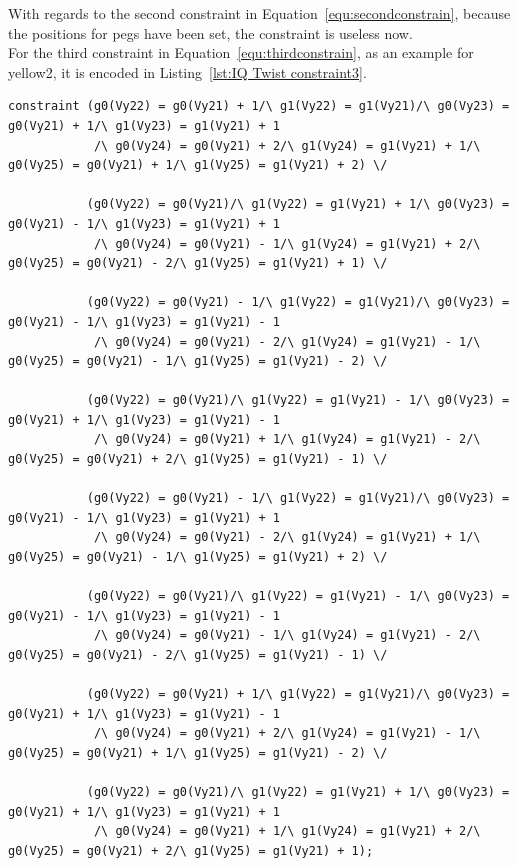 \bigskip
\smallbreak
With regards to the second constraint in Equation~\ref{equ:secondconstrain}, because the positions for pegs have been set, the constraint is useless now.
\\For the third constraint in Equation~\ref{equ:thirdconstrain}, as an example for yellow2, it is encoded in Listing~\ref{lst:IQ Twist constraint3}.
\begin{lstlisting}[language=minizinc,numbers=none,caption={Encoding for constraint three},label={lst:IQ Twist constraint3}]
constraint (g0(Vy22) = g0(Vy21) + 1/\ g1(Vy22) = g1(Vy21)/\ g0(Vy23) = g0(Vy21) + 1/\ g1(Vy23) = g1(Vy21) + 1
            /\ g0(Vy24) = g0(Vy21) + 2/\ g1(Vy24) = g1(Vy21) + 1/\ g0(Vy25) = g0(Vy21) + 1/\ g1(Vy25) = g1(Vy21) + 2) \/
            
           (g0(Vy22) = g0(Vy21)/\ g1(Vy22) = g1(Vy21) + 1/\ g0(Vy23) = g0(Vy21) - 1/\ g1(Vy23) = g1(Vy21) + 1
            /\ g0(Vy24) = g0(Vy21) - 1/\ g1(Vy24) = g1(Vy21) + 2/\ g0(Vy25) = g0(Vy21) - 2/\ g1(Vy25) = g1(Vy21) + 1) \/
            
           (g0(Vy22) = g0(Vy21) - 1/\ g1(Vy22) = g1(Vy21)/\ g0(Vy23) = g0(Vy21) - 1/\ g1(Vy23) = g1(Vy21) - 1
            /\ g0(Vy24) = g0(Vy21) - 2/\ g1(Vy24) = g1(Vy21) - 1/\ g0(Vy25) = g0(Vy21) - 1/\ g1(Vy25) = g1(Vy21) - 2) \/
            
           (g0(Vy22) = g0(Vy21)/\ g1(Vy22) = g1(Vy21) - 1/\ g0(Vy23) = g0(Vy21) + 1/\ g1(Vy23) = g1(Vy21) - 1
            /\ g0(Vy24) = g0(Vy21) + 1/\ g1(Vy24) = g1(Vy21) - 2/\ g0(Vy25) = g0(Vy21) + 2/\ g1(Vy25) = g1(Vy21) - 1) \/
            
           (g0(Vy22) = g0(Vy21) - 1/\ g1(Vy22) = g1(Vy21)/\ g0(Vy23) = g0(Vy21) - 1/\ g1(Vy23) = g1(Vy21) + 1
            /\ g0(Vy24) = g0(Vy21) - 2/\ g1(Vy24) = g1(Vy21) + 1/\ g0(Vy25) = g0(Vy21) - 1/\ g1(Vy25) = g1(Vy21) + 2) \/
            
           (g0(Vy22) = g0(Vy21)/\ g1(Vy22) = g1(Vy21) - 1/\ g0(Vy23) = g0(Vy21) - 1/\ g1(Vy23) = g1(Vy21) - 1
            /\ g0(Vy24) = g0(Vy21) - 1/\ g1(Vy24) = g1(Vy21) - 2/\ g0(Vy25) = g0(Vy21) - 2/\ g1(Vy25) = g1(Vy21) - 1) \/
            
           (g0(Vy22) = g0(Vy21) + 1/\ g1(Vy22) = g1(Vy21)/\ g0(Vy23) = g0(Vy21) + 1/\ g1(Vy23) = g1(Vy21) - 1
            /\ g0(Vy24) = g0(Vy21) + 2/\ g1(Vy24) = g1(Vy21) - 1/\ g0(Vy25) = g0(Vy21) + 1/\ g1(Vy25) = g1(Vy21) - 2) \/
            
           (g0(Vy22) = g0(Vy21)/\ g1(Vy22) = g1(Vy21) + 1/\ g0(Vy23) = g0(Vy21) + 1/\ g1(Vy23) = g1(Vy21) + 1
            /\ g0(Vy24) = g0(Vy21) + 1/\ g1(Vy24) = g1(Vy21) + 2/\ g0(Vy25) = g0(Vy21) + 2/\ g1(Vy25) = g1(Vy21) + 1);
\end{lstlisting}
